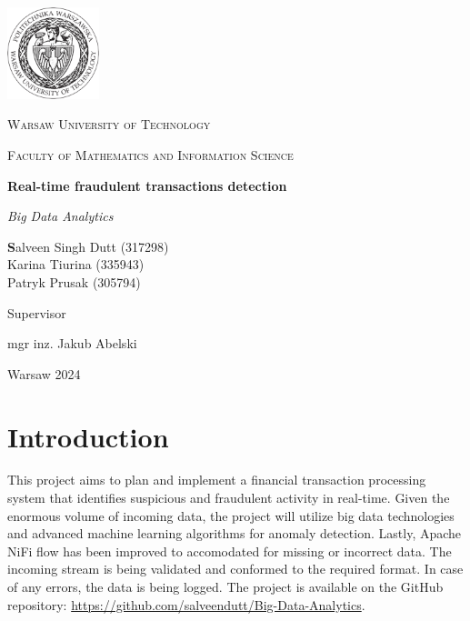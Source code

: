 \documentclass[12pt,a4paper, hidelinks]{article}
\begin{document}
\begin{titlepage}
    \centering
    \vspace*{0.5 cm}
    \includegraphics[width=0.20\textwidth]{images/logo.png}\par\vspace{1cm}
    {\scshape\LARGE Warsaw University of Technology \par}
    \vspace{1cm}
    {\scshape\Large Faculty of Mathematics and Information Science\par}
    \vspace{1.5cm}
    {\huge\bfseries Real-time fraudulent transactions detection \par}
    \vspace{1cm}
    {\Large\itshape Big Data Analytics\par}
    \vfill
    \begin{flushright}

    {\Large\textbf Salveen Singh Dutt (317298) \\ Karina Tiurina (335943)  \\ Patryk Prusak (305794) \par}
    \vfill
    {Supervisor\par}
    {\Large mgr inz. Jakub Abelski \par}
    
    \end{flushright}
    \vfill
    {\large Warsaw 2024\par}
    \vspace{1cm}
\end{titlepage}

\newpage

\tableofcontents
\newpage %

\section*{Introduction}

This project aims to plan and implement a financial transaction processing system that identifies suspicious and fraudulent activity in real-time. Given the enormous volume of incoming data, the project will utilize big data technologies and advanced machine learning algorithms for anomaly detection. Lastly, Apache NiFi flow has been improved to accomodated for missing or incorrect data. The incoming stream is being validated and conformed to the required format. In case of any errors, the data is being logged. The project is available on the GitHub repository: \href{https://github.com/salveendutt/Big-Data-Analytics}{https://github.com/salveendutt/Big-Data-Analytics}.
\end{document}
